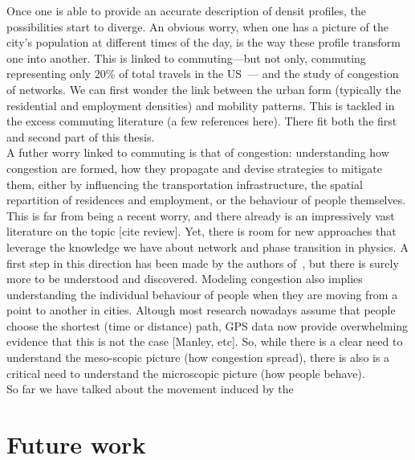 Once one is able to provide an accurate description of densit profiles, the
possibilities start to diverge. An obvious worry, when one has a picture of the
city's population at different times of the day, is the way these profile
transform one into another. This is linked to commuting---but not only, commuting
representing only $20\%$ of total travels in the US~\cite{FHWA-PL-11-022}--- and
the study of congestion of networks. We can first wonder the link between the
urban form (typically the residential and employment densities) and mobility
patterns. This is tackled in the excess commuting literature (a few references
here). There fit both the first and second part of this thesis.\\
A futher worry linked to commuting is that of congestion: understanding how
congestion are formed, how they propagate and devise strategies to mitigate
them, either by influencing the transportation infrastructure, the spatial
repartition of residences and employment, or the behaviour of people themselves.
This is far from being a recent worry, and there already is an impressively vast
literature on the topic [cite review]. Yet, there is room for new approaches
that leverage the knowledge we have about network and phase transition in
physics. A first step in this direction has been made by the authors
of~\cite{Daqing:2015}, but there is surely more to be understood and
discovered. 
Modeling congestion also implies understanding the individual behaviour of
people when they are moving from a point to another in cities. Altough most
research nowadays assume that people choose the shortest (time or distance)
path, GPS data now provide overwhelming evidence that this is not the case
[Manley, etc]. So, while there is a clear need to understand the meso-scopic
picture (how congestion spread), there is also is a critical need to understand
the microscopic picture (how people behave).\\

So far we have talked about the movement induced by the 


\section{Future work}
\label{sec:future_work}

